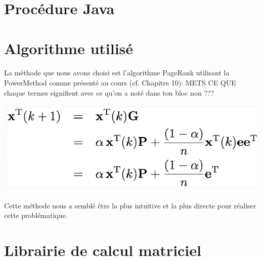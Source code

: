 \documentclass[10pt,a4paper]{article}
\begin{document}



\newpage

\section{Procédure Java}
\section{Algorithme utilisé}

\paragraph{}La méthode que nous avons choisi est l'algorithme PageRank utilisant la PowerMethod comme présenté au cours (cf. Chapitre 10): METS CE QUE chaque termes signifient avec ce qu'on a noté dans ton bloc non ???
\begin{center}
\includegraphics[scale=0.4]{PowerMethod.png} 
\end{center}


\paragraph{}Cette méthode nous a semblé être la plus intuitive et la plus directe pour réaliser cette problématique.

\section{Librairie de calcul matriciel}
\end{document}
